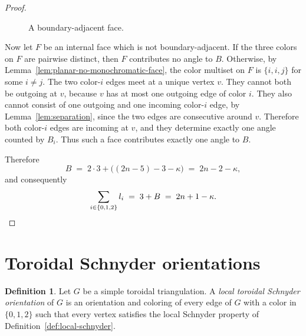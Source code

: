 \documentclass[11pt]{amsart}
\newcommand{\Zthree}{\{0,1,2\}}
\theoremstyle{plain}
\theoremstyle{definition}
\newtheorem{definition}[theorem]{Definition}
\theoremstyle{remark}
\begin{document}
\begin{proof}
\begin{figure}[H]
\caption{A boundary-adjacent face.}
\label{fig:boundary-adjacent-face}
\end{figure}

Now let $F$ be an internal face which is not boundary-adjacent. If the three colors on $F$ are pairwise distinct, then $F$ contributes no angle to $B$. Otherwise, by Lemma~\ref{lem:planar-no-monochromatic-face}, the color multiset on $F$ is $\{i, i, j\}$ for some $i \neq j$. The two color-$i$ edges meet at a unique vertex $v$. They cannot both be outgoing at $v$, because $v$ has at most one outgoing edge of color $i$. They also cannot consist of one outgoing and one incoming color-$i$ edge, by Lemma~\ref{lem:separation}, since the two edges are consecutive around $v$. Therefore both color-$i$ edges are incoming at $v$, and they determine exactly one angle counted by $B_i$. Thus such a face contributes exactly one angle to $B$.

Therefore
\[
  B \;=\; 2 \cdot 3 + \bigl((2n - 5) - 3 - \kappa\bigr) \;=\; 2n - 2 - \kappa,
\]
and consequently
\[
  \sum_{i \in \Zthree} l_i \;=\; 3 + B \;=\; 2n + 1 - \kappa. \qedhere
\]
\end{proof}


\section{Toroidal Schnyder orientations}
\label{sec:toroidal}

\begin{definition}
\label{def:local-toroidal-schnyder}
Let $G$ be a simple toroidal triangulation. A \emph{local toroidal Schnyder orientation} of $G$ is an orientation and coloring of every edge of $G$ with a color in $\Zthree$ such that every vertex satisfies the local Schnyder property of Definition~\ref{def:local-schnyder}.
\end{definition}
\end{document}
